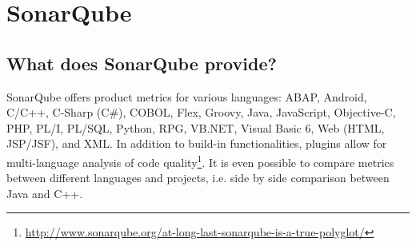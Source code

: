 \section{SonarQube}
\subsection{What does SonarQube provide?}
SonarQube offers product metrics for various languages: ABAP, Android, C/C++,
C-Sharp (C\#), COBOL, Flex, Groovy, Java, JavaScript, Objective-C, PHP, PL/I,
PL/SQL, Python, RPG, VB.NET, Visual Basic 6, Web (HTML, JSP/JSF), and XML. In
addition to build-in functionalities, plugins allow for multi-language analysis
of code
quality\footnote{\url{http://www.sonarqube.org/at-long-last-sonarqube-is-a-true-polyglot/}}.
It is even possible to compare metrics between different languages and projects,
i.e. side by side comparison between Java and C++.

